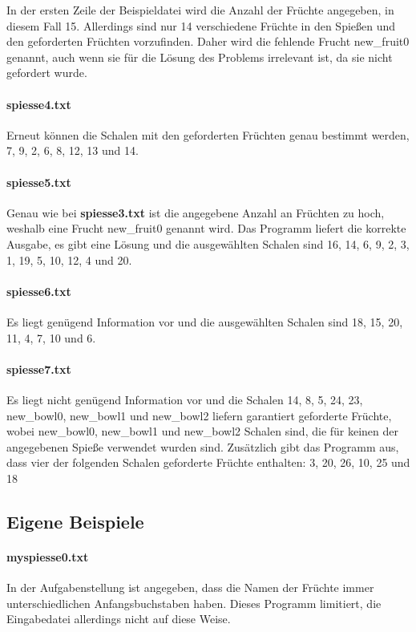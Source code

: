 \documentclass[a4paper,10pt,ngerman]{scrartcl}
\begin{document}
In der ersten Zeile der Beispieldatei wird die Anzahl der Früchte angegeben, in diesem Fall 15.
Allerdings sind nur 14 verschiedene Früchte in den Spießen und den geforderten Früchten vorzufinden.
Daher wird die fehlende Frucht new\_fruit0 genannt, auch wenn sie für die Lösung des Problems irrelevant ist, da sie nicht gefordert wurde.

\paragraph{spiesse4.txt}
Erneut können die Schalen mit den geforderten Früchten genau bestimmt werden, 7, 9, 2, 6, 8, 12, 13 und 14.

\paragraph{spiesse5.txt}
Genau wie bei \textbf{spiesse3.txt} ist die angegebene Anzahl an Früchten zu hoch, weshalb eine Frucht new\_fruit0 genannt wird.
Das Programm liefert die korrekte Ausgabe, es gibt eine Lösung und die ausgewählten Schalen sind 16, 14, 6, 9, 2, 3, 1, 19, 5, 10, 12, 4 und 20.

\paragraph{spiesse6.txt}
Es liegt genügend Information vor und die ausgewählten Schalen sind 18, 15, 20, 11, 4, 7, 10 und 6.

\paragraph{spiesse7.txt}
Es liegt nicht genügend Information vor und die Schalen 14, 8, 5, 24, 23, new\_bowl0, new\_bowl1 und new\_bowl2 liefern garantiert geforderte Früchte, wobei new\_bowl0, new\_bowl1 und new\_bowl2 Schalen sind, die für keinen der angegebenen Spieße verwendet wurden sind.
Zusätzlich gibt das Programm aus, dass vier der folgenden Schalen geforderte Früchte enthalten: 3, 20, 26, 10, 25 und 18
\subsection{Eigene Beispiele}

\paragraph{myspiesse0.txt}
In der Aufgabenstellung ist angegeben, dass die Namen der Früchte immer unterschiedlichen Anfangsbuchstaben haben.
Dieses Programm limitiert, die Eingabedatei allerdings nicht auf diese Weise.
\end{document}
